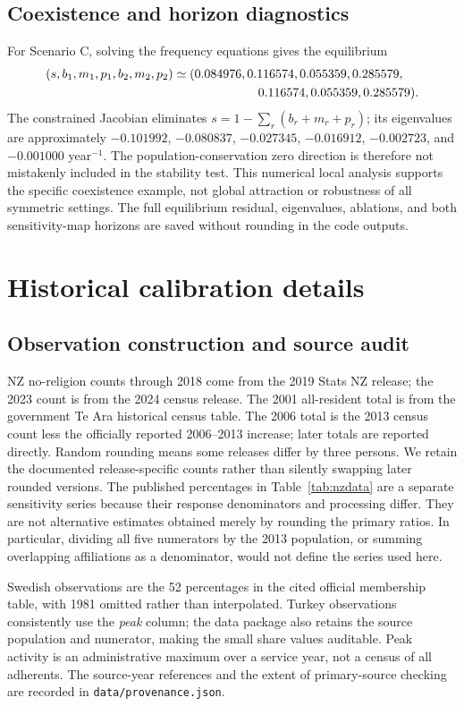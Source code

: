 \documentclass[11pt,a4paper]{article}
\begin{document}
\subsection{Coexistence and horizon diagnostics}
For Scenario C, solving the frequency equations gives the equilibrium
\begin{align}
(s,b_1,m_1,p_1,b_2,m_2,p_2)
&\simeq(0.084976,0.116574,0.055359,0.285579,\nonumber\\
&\hspace{24mm}0.116574,0.055359,0.285579).
\end{align}
The constrained Jacobian eliminates $s=1-\sum_r(b_r+m_r+p_r)$; its eigenvalues are approximately
$-0.101992$, $-0.080837$, $-0.027345$, $-0.016912$, $-0.002723$, and $-0.001000$ year$^{-1}$. The population-conservation zero direction is therefore not mistakenly included in the stability test. This numerical local analysis supports the specific coexistence example, not global attraction or robustness of all symmetric settings. The full equilibrium residual, eigenvalues, ablations, and both sensitivity-map horizons are saved without rounding in the code outputs.

\section{Historical calibration details}
\label{app:fitting}
\subsection{Observation construction and source audit}

NZ no-religion counts through 2018 come from the 2019 Stats NZ release; the 2023 count is from the 2024 census release. The 2001 all-resident total is from the government Te Ara historical census table. The 2006 total is the 2013 census count less the officially reported 2006--2013 increase; later totals are reported directly. Random rounding means some releases differ by three persons. We retain the documented release-specific counts rather than silently swapping later rounded versions. The published percentages in Table~\ref{tab:nzdata} are a separate sensitivity series because their response denominators and processing differ. They are not alternative estimates obtained merely by rounding the primary ratios. In particular, dividing all five numerators by the 2013 population, or summing overlapping affiliations as a denominator, would not define the series used here.

Swedish observations are the 52 percentages in the cited official membership table, with 1981 omitted rather than interpolated. Turkey observations consistently use the \emph{peak} column; the data package also retains the source population and numerator, making the small share values auditable. Peak activity is an administrative maximum over a service year, not a census of all adherents. The source-year references and the extent of primary-source checking are recorded in \texttt{data/provenance.json}.
\end{document}
